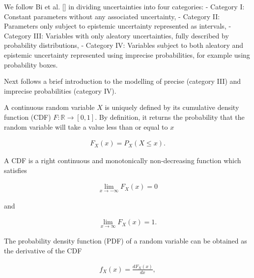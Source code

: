We follow Bi et al. [] in dividing uncertainties into four categories:     - Category I: Constant parameters without any associated uncertainty,     - Category II: Parameters only subject to epistemic uncertainty represented as intervals,     - Category III: Variables with only aleatory uncertainties, fully described by probability distributions,     - Category IV: Variables subject to both aleatory and epistemic uncertainty represented using imprecise probabilities, for example using probability boxes.



Next follows a brief introduction to the modelling of precise (category III) and imprecise probabilities (category IV).



A continuous random variable \(X\) is uniquely defined by its cumulative density function (CDF) \(F: \mathbb{R} \rightarrow [0,1]\). By definition, it returns the probability that the random variable will take a value less than or equal to \(x\)



\begin{equation*}
\begin{split}    F_X(x) = P_X(X \leq x).\end{split}\end{equation*}


A CDF is a right continuous and monotonically non-decreasing function which satisfies



\begin{equation*}
\begin{split}    \lim_{x\rightarrow -\infty} F_X(x) = 0\end{split}\end{equation*}


and



\begin{equation*}
\begin{split}    \lim_{x\rightarrow \infty}  F_X(x) = 1.\end{split}\end{equation*}


The probability density function (PDF) of a random variable can be obtained as the derivative of the CDF



\begin{equation*}
\begin{split}    f_X(x) = \frac{dF_X(x)}{dx},\end{split}\end{equation*}



